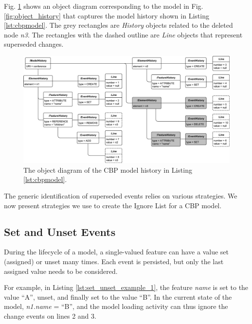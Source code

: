 \documentclass{llncs}
\begin{document}
    Fig. \ref{fig:history_structure} shows an object diagram corresponding to the model in Fig. \ref{fig:object_history} that captures the model history shown in Listing \ref{lst:cbpmodel}. The grey rectangles are \emph{History} objects related to the deleted node \emph{n3}. The rectangles with the dashed outline are \emph{Line} objects that represent superseded changes. 
    
    \begin{figure}[ht]
        \centering
        \includegraphics[width=\linewidth]{history_structure}
        \caption{The object diagram of the CBP model history in Listing \ref{lst:cbpmodel}.}
        \label{fig:history_structure}
    \end{figure}
    
    The generic identification of superseded events relies on various strategies.  We now present strategies we use to create the Ignore List for a CBP model. 
    
    
    \subsection{Set and Unset Events}
    \label{subsec:set_and_unset_operations}
    During the lifecycle of a model, a single-valued feature can have a value set (assigned) or unset many times.  Each event is persisted, but only the last assigned value needs to be considered.
    
    For example, in Listing \ref{lst:set_unset_example_1}, the feature \emph{name} is set to the value ``A'', unset, and finally set to the value ``B''.  In the current state of the model, \emph{n1.name} = ``B'', and the model loading activity can thus ignore the change events on lines 2 and 3. 
    
\end{document}
